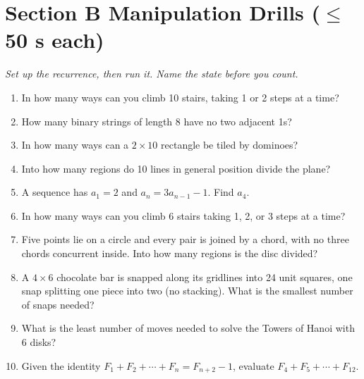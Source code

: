 \documentclass[11pt,a4paper]{article}
\begin{document}
\section*{Section B \quad Manipulation Drills \hfill{\normalfont\small($\leq$50 s each)}}

\noindent\textit{Set up the recurrence, then run it. Name the state before you count.}

\begin{enumerate}

\item In how many ways can you climb 10 stairs, taking 1 or 2 steps at a time?

\item How many binary strings of length 8 have no two adjacent 1s?

\item In how many ways can a $2\times10$ rectangle be tiled by dominoes?

\item Into how many regions do 10 lines in general position divide the plane?

\item A sequence has $a_1=2$ and $a_n=3a_{n-1}-1$. Find $a_4$.

\item In how many ways can you climb 6 stairs taking 1, 2, or 3 steps at a time?

\item Five points lie on a circle and every pair is joined by a chord, with no three chords concurrent inside. Into how many regions is the disc divided?

\item A $4\times6$ chocolate bar is snapped along its gridlines into 24 unit squares, one snap splitting one piece into two (no stacking). What is the smallest number of snaps needed?

\item What is the least number of moves needed to solve the Towers of Hanoi with 6 disks?

\item Given the identity $F_1+F_2+\cdots+F_n=F_{n+2}-1$, evaluate $F_4+F_5+\cdots+F_{12}$.

\end{enumerate}

\end{document}
